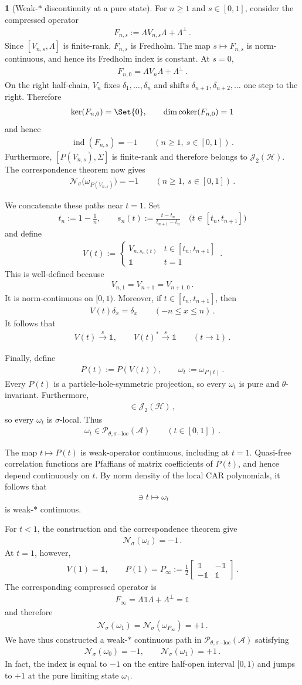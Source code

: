 \documentclass[a4paper,10pt]{article}
\numberwithin{equation}{section}
\theoremstyle{plain}
\theoremstyle{plain}
\theoremstyle{plain}
\theoremstyle{plain}
\theoremstyle{plain}
\theoremstyle{remark}
\theoremstyle{definition}
\newtheorem{example}[example]{\protect\examplename}
\providecommand{\examplename}{Example}
\newcommand{\calA}{\mathcal{A}}
\newcommand{\calN}{\mathcal{N}}
\newcommand{\calH}{\mathcal{H}}
\newcommand{\calJ}{\mathcal{J}}
\newcommand{\calP}{\mathcal{P}}
\newcommand{\Id}{\mathds{1}}
\newcommand{\findex}{\operatorname{ind}}
\newcommand{\coker}{\operatorname{coker}}
\newcommand{\eq}[1]{\begin{align*}#1\end{align*}}
\newcommand{\onehalf}{\frac{1}{2}}
\begin{document}
\begin{example}[Weak-$*$ discontinuity at a pure state]
For $n\geq1$ and $s\in[0,1]$, consider the compressed operator
\eq{
F_{n,s}:=\Lambda V_{n,s}\Lambda+\Lambda^\perp\,.
}
Since $[V_{n,s},\Lambda]$ is finite-rank, $F_{n,s}$ is Fredholm. The map
$s\mapsto F_{n,s}$ is norm-continuous, and hence its Fredholm index is
constant. At $s=0$,
\eq{
F_{n,0}=\Lambda V_n\Lambda+\Lambda^\perp\,.
}
On the right half-chain, $V_n$ fixes
$\delta_1,\dots,\delta_n$ and shifts
$\delta_{n+1},\delta_{n+2},\dots$ one step to the right. Therefore
\eq{
\ker(F_{n,0})=\Set{0},
\qquad
\dim\coker(F_{n,0})=1
}
and hence
\eq{
\findex(F_{n,s})=-1
\qquad
(n\geq1,\ s\in[0,1])\,.
}
Furthermore, $[P(V_{n,s}),\Sigma]$ is finite-rank and therefore belongs to
$\calJ_2(\calH)$. The correspondence theorem now gives
\eq{
\calN_\sigma\bigl(\omega_{P(V_{n,s})}\bigr)=-1
\qquad
(n\geq1,\ s\in[0,1])\,.
}

We concatenate these paths near $t=1$. Set
\eq{
t_n:=1-\frac1n,
\qquad
s_n(t):=\frac{t-t_n}{t_{n+1}-t_n}
\quad
\bigl(t\in[t_n,t_{n+1}]\bigr)
}
and define
\eq{
V(t):=
\begin{cases}
V_{n,s_n(t)} & t\in[t_n,t_{n+1}]\\
\Id & t=1
\end{cases}\,.
}
This is well-defined because
\eq{
V_{n,1}=V_{n+1}=V_{n+1,0}\,.
}
It is norm-continuous on $[0,1)$. Moreover, if
$t\in[t_n,t_{n+1}]$, then
\eq{
V(t)\delta_x=\delta_x
\qquad
(-n\leq x\leq n)\,.
}
It follows that
\eq{
V(t)\stackrel{s}{\longrightarrow}\Id,
\qquad
V(t)^*\stackrel{s}{\longrightarrow}\Id
\qquad
(t\longrightarrow1)\,.
}

Finally, define
\eq{
P(t):=P(V(t)),
\qquad
\omega_t:=\omega_{P(t)}\,.
}
Every $P(t)$ is a particle-hole-symmetric projection, so every $\omega_t$ is
pure and $\theta$-invariant. Furthermore,
\eq{
[P(t),\Sigma]\in\calJ_2(\calH)\, ,
}
so every $\omega_t$ is $\sigma$-local. Thus
\eq{
\omega_t\in\calP_{\theta,\sigma\mathrm{-loc}}(\calA)
\qquad
(t\in[0,1])\,.
}

The map $t\mapsto P(t)$ is weak-operator continuous, including at $t=1$.
Quasi-free correlation functions are Pfaffians of matrix coefficients of
$P(t)$, and hence depend continuously on $t$. By norm density of the local
CAR polynomials, it follows that
\eq{
[0,1]\ni t\longmapsto\omega_t
}
is weak-$*$ continuous.

For $t<1$, the construction and the correspondence theorem give
\eq{
\calN_\sigma(\omega_t)=-1\,.
}
At $t=1$, however,
\eq{
V(1)=\Id,
\qquad
P(1)
=
P_\infty
:=
\onehalf
\begin{bmatrix}
\Id & -\Id\\
-\Id & \Id
\end{bmatrix}\,.
}
The corresponding compressed operator is
\eq{
F_\infty=\Lambda\Id\Lambda+\Lambda^\perp=\Id
}
and therefore
\eq{
\calN_\sigma(\omega_1)
=
\calN_\sigma(\omega_{P_\infty})
=
+1\,.
}
We have thus constructed a weak-$*$ continuous path in
$\calP_{\theta,\sigma\mathrm{-loc}}(\calA)$ satisfying
\eq{
\calN_\sigma(\omega_0)=-1,
\qquad
\calN_\sigma(\omega_1)=+1\,.
}
In fact, the index is equal to $-1$ on the entire half-open interval
$[0,1)$ and jumps to $+1$ at the pure limiting state $\omega_1$.


\end{example}
\end{document}
